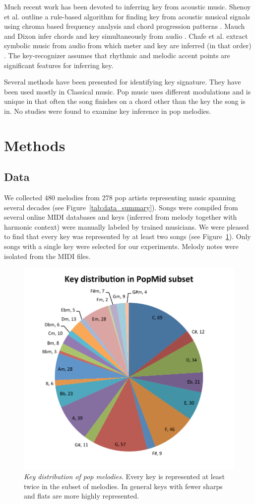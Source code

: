 \documentclass[letterpaper]{article}
\begin{document}
Much recent work has been devoted to inferring key from acoustic music. Shenoy et al. outline a rule-based algorithm for finding key from acoustic musical signals using chroma based frequency analysis and chord progression patterns \cite{shenoy2004key}. Mauch and Dixon infer chords and key simultaneously from audio \cite{mauch2010simultaneous}. Chafe et al. extract symbolic music from audio from which meter and key are inferred (in that order) \cite{chafe1982toward}. The key-recognizer assumes that rhythmic and melodic accent points are significant features for inferring key.

Several methods have been presented for identifying key signature. They have been used mostly in Classical music. Pop music uses different modulations and is unique in that often the song finishes on a chord other than the key the song is in. No studies were found to examine key inference in pop melodies.

\section{Methods}

\subsection{Data}

We collected 480 melodies from 278 pop artists representing music spanning several decades (see Figure~\ref{tab:data_summary}). Songs were compiled from several online MIDI databases and keys (inferred from melody together with harmonic context) were manually labeled by trained musicians. We were pleased to find that every key was represented by at least two songs (see Figure~\ref{fig:key_distribution}). Only songs with a single key were selected for our experiments. Melody notes were isolated from the MIDI files. 

\begin{figure}
  \centering
 \includegraphics[width=.4\textwidth]{./key_distribution.pdf}
  \caption{\emph{Key distribution of pop melodies}. Every key is represented at least twice in the subset of melodies. In general keys with fewer sharps and flats are more highly represented.}
  \label{fig:key_distribution}
\end{figure}
\end{document}
